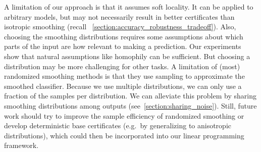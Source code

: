 \documentclass{article} %
\theoremstyle{plain}
\theoremstyle{definition}
\theoremstyle{remark}
\begin{document}
A limitation of our approach is that it assumes soft locality.
It can be applied to arbitrary models, but may not necessarily result in better certificates than isotropic smoothing (recall
~\autoref{section:accuracy_robustness_tradeoff}).
Also, choosing the smoothing distributions requires some
assumptions about which parts of the input are how relevant to making a prediction.
Our experiments show that natural assumptions like homophily can be sufficient.
But choosing a distribution may be more challenging for other tasks.
A limitation of (most) randomized smoothing methods is that they use sampling to approximate the smoothed classifier.
Because we use multiple distributions, we can only use a fraction of the samples per distribution.
We can alleviate this problem by sharing smoothing distributions among outputs (see~\autoref{section:sharing_noise}).
Still, future work should try to improve the sample efficiency of randomized smoothing or develop deterministic base certificates (e.g.\ by generalizing \citep{Levine2020} to anisotropic distributions), which could then be incorporated into our
linear programming framework.
\end{document}
